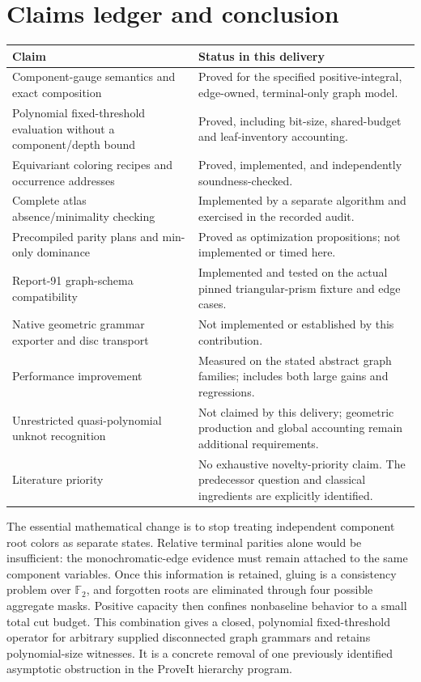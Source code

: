 \documentclass[11pt,letterpaper]{article}
\theoremstyle{definition}
\theoremstyle{remark}\newtheorem{remark}[theorem]{Remark}
\newcommand{\F}{\mathbb F}
\begin{document}
\section{Claims ledger and conclusion}
\label{sec:ledger}
\begin{longtable}{@{}>{\raggedright\arraybackslash}p{}>{\raggedright\arraybackslash}p{}@{}}
\toprule
Claim & Status in this delivery\\\midrule\endhead
Component-gauge semantics and exact composition & Proved for the specified positive-integral, edge-owned, terminal-only graph model.\\
Polynomial fixed-threshold evaluation without a component/depth bound & Proved, including bit-size, shared-budget and leaf-inventory accounting.\\
Equivariant coloring recipes and occurrence addresses & Proved, implemented, and independently soundness-checked.\\
Complete atlas absence/minimality checking & Implemented by a separate algorithm and exercised in the recorded audit.\\
Precompiled parity plans and min-only dominance & Proved as optimization propositions; not implemented or timed here.\\
Report-91 graph-schema compatibility & Implemented and tested on the actual pinned triangular-prism fixture and edge cases.\\
Native geometric grammar exporter and disc transport & Not implemented or established by this contribution.\\
Performance improvement & Measured on the stated abstract graph families; includes both large gains and regressions.\\
Unrestricted quasi-polynomial unknot recognition & Not claimed by this delivery; geometric production and global accounting remain additional requirements.\\
Literature priority & No exhaustive novelty-priority claim. The predecessor question and classical ingredients are explicitly identified.\\
\bottomrule
\end{longtable}

The essential mathematical change is to stop treating independent component root colors as separate states. Relative terminal parities alone would be insufficient: the monochromatic-edge evidence must remain attached to the same component variables. Once this information is retained, gluing is a consistency problem over $\F_2$, and forgotten roots are eliminated through four possible aggregate masks. Positive capacity then confines nonbaseline behavior to a small total cut budget. This combination gives a closed, polynomial fixed-threshold operator for arbitrary supplied disconnected graph grammars and retains polynomial-size witnesses. It is a concrete removal of one previously identified asymptotic obstruction in the ProveIt hierarchy program.
\end{document}
